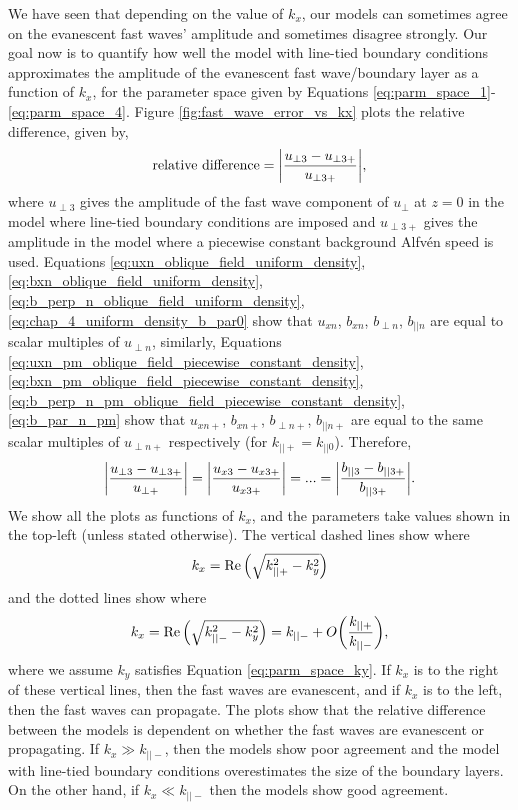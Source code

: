 We have seen that depending on the value of $k_x$, our models can sometimes agree on the evanescent fast waves' amplitude and sometimes disagree strongly. Our goal now is to quantify how well the model with line-tied boundary conditions approximates the amplitude of the evanescent fast wave/boundary layer as a function of $k_x$, for the parameter space given by Equations \eqref{eq:parm_space_1}-\eqref{eq:parm_space_4}. Figure \ref{fig:fast_wave_error_vs_kx} plots the relative difference, given by,
\begin{equation}
    \label{eq:relative_difference}
    \text{relative difference} = \abs{\frac{u_{\perp3} - u_{\perp 3+}}{u_{\perp 3+}}},
\end{equation}
where $u_{\perp3}$ gives the amplitude of the fast wave component of $u_\perp$ at $z=0$ in the model where line-tied boundary conditions are imposed and $u_{\perp 3+}$ gives the amplitude in the model where a piecewise constant background Alfv\'en speed is used. Equations \eqref{eq:uxn_oblique_field_uniform_density}, \eqref{eq:bxn_oblique_field_uniform_density}, \eqref{eq:b_perp_n_oblique_field_uniform_density}, \eqref{eq:chap_4_uniform_density_b_par0} show that $u_{xn}$, $b_{xn}$, $b_{\perp n}$, $b_{|| n}$ are equal to scalar multiples of $u_{\perp n}$, similarly, Equations \eqref{eq:uxn_pm_oblique_field_piecewise_constant_density}, \eqref{eq:bxn_pm_oblique_field_piecewise_constant_density}, \eqref{eq:b_perp_n_pm_oblique_field_piecewise_constant_density}, \eqref{eq:b_par_n_pm} show that $u_{xn+}$, $b_{xn+}$, $b_{\perp n+}$, $b_{|| n+}$ are equal to the same scalar multiples of $u_{\perp n+}$ respectively (for $k_{||+}=k_{||0}$). Therefore,
\begin{equation}
    \abs{\frac{u_{\perp3} - u_{\perp 3+}}{u_{\perp +}}} = \abs{\frac{u_{x3} - u_{x 3+}}{u_{x 3+}}} = ... = \abs{\frac{b_{||3} - b_{|| 3+}}{b_{|| 3+}}}.
\end{equation}
We show all the plots as functions of $k_x$, and the parameters take values shown in the top-left (unless stated otherwise). The vertical dashed lines show where 
\[k_x = \Re\qty(\sqrt{k_{||+}^2-k_y^2})\] 
and the dotted lines show where 
\[k_x = \Re\qty(\sqrt{k_{||-}^2-k_y^2})= k_{||-} + O\qty(\frac{k_{||+}}{k_{||-}}),\]
where we assume $k_y$ satisfies Equation \eqref{eq:parm_space_ky}.
If $k_x$ is to the right of these vertical lines, then the fast waves are evanescent, and if $k_x$ is to the left, then the fast waves can propagate. The plots show that the relative difference between the models is dependent on whether the fast waves are evanescent or propagating. If $k_x \gg k_{||-}$, then the models show poor agreement and the model with line-tied boundary conditions overestimates the size of the boundary layers. On the other hand, if $k_x \ll k_{||-}$
then the models show good agreement.

